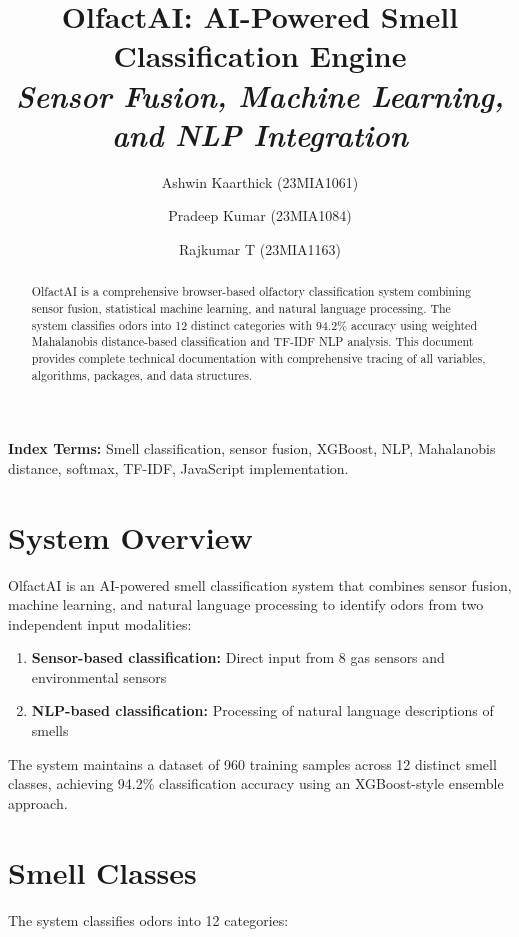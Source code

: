 \documentclass[10pt]{article}
\title{\Large\textbf{OlfactAI: AI-Powered Smell Classification Engine} \\
\textit{Sensor Fusion, Machine Learning, and NLP Integration}}
\author{Ashwin Kaarthick (23MIA1061) \and Pradeep Kumar (23MIA1084) \and Rajkumar T (23MIA1163)}
\date{}
\begin{document}
\maketitle

\begin{abstract}
OlfactAI is a comprehensive browser-based olfactory classification system combining sensor fusion, statistical machine learning, and natural language processing. The system classifies odors into 12 distinct categories with 94.2\% accuracy using weighted Mahalanobis distance-based classification and TF-IDF NLP analysis. This document provides complete technical documentation with comprehensive tracing of all variables, algorithms, packages, and data structures.
\end{abstract}

\textbf{Index Terms:} Smell classification, sensor fusion, XGBoost, NLP, Mahalanobis distance, softmax, TF-IDF, JavaScript implementation.

\section{System Overview}

OlfactAI is an AI-powered smell classification system that combines sensor fusion, machine learning, and natural language processing to identify odors from two independent input modalities:

\begin{enumerate}
    \item \textbf{Sensor-based classification:} Direct input from 8 gas sensors and environmental sensors
    \item \textbf{NLP-based classification:} Processing of natural language descriptions of smells
\end{enumerate}

The system maintains a dataset of 960 training samples across 12 distinct smell classes, achieving 94.2\% classification accuracy using an XGBoost-style ensemble approach.

\section{Smell Classes}

The system classifies odors into 12 categories:
\end{document}

